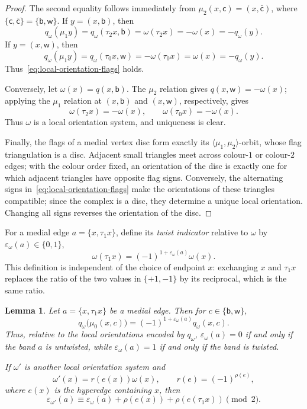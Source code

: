 \documentclass[10pt,a4paper]{article}
\newtheorem{lemma}[theorem]{Lemma}
\theoremstyle{definition}
\theoremstyle{remark}
\begin{document}
\begin{proof}
The second equality follows immediately from $\mu_2(x,\mathsf c)=(x,\bar{\mathsf c})$, where $\{\mathsf c,\bar{\mathsf c}\}=\{\mathsf b,{\mathsf w}\}$. If $y=(x,\mathsf b)$, then
\[
 q_\omega(\mu_1y)
 =q_\omega(\tau_2x,\mathsf b)
 =\omega(\tau_2x)=-\omega(x)=-q_\omega(y).
\]
If $y=(x,\mathsf w)$, then
\[
 q_\omega(\mu_1y)
 =q_\omega(\tau_0x,\mathsf w)
 =-\omega(\tau_0x)=\omega(x)=-q_\omega(y).
\]
Thus~\eqref{eq:local-orientation-flags} holds.

Conversely, let $\omega(x)=q(x,\mathsf b)$. The $\mu_2$ relation gives $q(x,\mathsf w)=-\omega(x)$; applying the $\mu_1$ relation at $(x,\mathsf b)$ and $(x,\mathsf w)$, respectively, gives
\[
  \omega(\tau_2x)=-\omega(x),\qquad
  \omega(\tau_0x)=-\omega(x).
\]
Thus $\omega$ is a local orientation system, and uniqueness is clear.

Finally, the flags of a medial vertex disc form exactly its $\langle\mu_1,\mu_2\rangle$-orbit, whose flag triangulation is a disc. Adjacent small triangles meet across colour-$1$ or colour-$2$ edges; with the colour order fixed, an orientation of the disc is exactly one for which adjacent triangles have opposite flag signs. Conversely, the alternating signs in~\eqref{eq:local-orientation-flags} make the orientations of these triangles compatible; since the complex is a disc, they determine a unique local orientation. Changing all signs reverses the orientation of the disc.
\end{proof}

For a medial edge $a=\{x,\tau_1x\}$, define its \emph{twist indicator} relative to $\omega$ by $\varepsilon_\omega(a)\in\{0,1\}$,
\[
 \omega(\tau_1x)=(-1)^{1+\varepsilon_\omega(a)}\omega(x).
 \tag{T}\label{eq:twist}
\]
This definition is independent of the choice of endpoint $x$: exchanging $x$ and $\tau_1x$ replaces the ratio of the two values in $\{+1,-1\}$ by its reciprocal, which is the same ratio.

\begin{lemma}\label{lem:twist-flag}
Let $a=\{x,\tau_1x\}$ be a medial edge. Then for $c\in\{\mathsf b,\mathsf w\}$,
\[
 q_\omega\bigl(\mu_0(x,c)\bigr)
 =(-1)^{1+\varepsilon_\omega(a)}q_\omega(x,c). \tag{U}
 \label{eq:twist-from-flags}
\]
Thus, relative to the local orientations encoded by $q_\omega$, $\varepsilon_\omega(a)=0$ if and only if the band $a$ is untwisted, while $\varepsilon_\omega(a)=1$ if and only if the band is twisted.

If $\omega'$ is another local orientation system and
\[
 \omega'(x)=r(e(x))\omega(x),\qquad
 r(e)=(-1)^{\rho(e)},
\]
where $e(x)$ is the hyperedge containing $x$, then
\[
 \varepsilon_{\omega'}(a)
 \equiv\varepsilon_\omega(a)+\rho(e(x))
 +\rho(e(\tau_1x))\pmod 2. \tag{S}\label{eq:twist-switch}
\]
\end{lemma}
\end{document}
